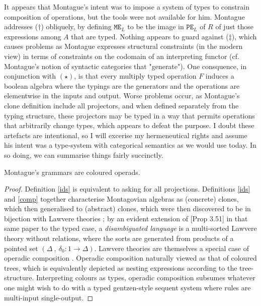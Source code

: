 It appears that Montague's intent was to impose a system of types to constrain composition of operations, but the tools were not available for him. Montague addresses ($\dag$) obliquely, by defining $\texttt{ME}_L$ to be the image in $\texttt{PE}_L$ of $R$ of just those expressions among $A$ that are typed. Nothing appears to guard against ($\ddag$), which causes problems as Montague expresses structural constraints (in the modern view) in terms of constraints on the codomain of an interpreting functor (cf. Montague's notion of syntactic categories that "generate"). One consquence, in conjunction with $(\star)$, is that every multiply typed operation $F$ induces a boolean algebra where the typings are the generators and the operations are elementwise in the inputs and output. Worse problems occur, as Montague's clone definition include all projectors, and when defined separately from the typing structure, these projectors may be typed in a way that permits operations that arbitrarily change types, which appears to defeat the purpose. I doubt these artefacts are intentional, so I will excerise my hermeneutical rights and assume his intent was a type-system with categorical semantics as we would use today. In so doing, we can summarise things fairly succinctly.

\begin{proposition}
Montague's grammars are coloured operads.
\begin{proof}
Definition \ref{ids} is equivalent to asking for all projections. Definitions \ref{ids} and \ref{comp} together characterise Montagovian algebras as (concrete) clones, which then generalised to (abstract) clones, which were then discovered to be in bijection with Lawvere theories \citep{kerkhoff_short_2014}; by an evident extension of [Prop 3.51] in that same paper to the typed case, a \emph{disambiguated language} is a multi-sorted Lawvere theory without relations, where the sorts are generated from products of a pointed set $(\Delta\ , \ \delta_0 : 1 \rightarrow \Delta)$. Lawvere theories are themselves a special case of operadic composition \citep{yau_colored_2016}. Operadic composition naturally viewed as that of coloured trees, which is equivalently depicted as nesting expressions according to the tree-structure. Interpreting colours as types, operadic composition subsumes whatever one might wish to do with a typed gentzen-style sequent system where rules are multi-input single-output.
\end{proof}
\end{proposition}

